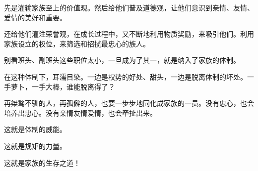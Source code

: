 \begin{this_body}
先是灌输家族至上的价值观。然后给他们普及道德观，让他们意识到亲情、友情、爱情的美好和重要。

还给他们灌注荣誉观，在成长过程中，又不断地利用物质奖励，来吸引他们。利用家族设立的权位，来筛选和招揽最忠心的族人。

别看班头、副班头这些职位太小，一旦成为了其一，就是纳入了家族的体制。

在这种体制下，耳濡目染。一边是权势的好处、甜头，一边是脱离体制的坏处。一手萝卜，一手大棒，谁能脱离得了？

再桀骜不驯的人，再孤僻的人，也要一步步地同化成家族的一员。没有忠心，也会培养出忠心。没有亲情友情爱情，也会牵扯出来。

这就是体制的威能。

这就是规矩的力量。

这就是家族的生存之道！

\end{this_body}

